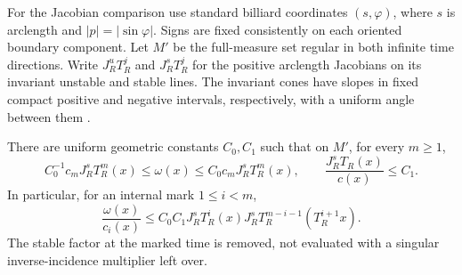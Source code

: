 For the Jacobian comparison use standard billiard coordinates
$(s,\varphi)$, where $s$ is arclength and $|p|=|\sin\varphi|$.
Signs are fixed consistently on each oriented boundary component.
Let $M'$ be the full-measure set regular in both infinite time
directions. Write $J^u_RT_R^j$ and $J^s_RT_R^j$ for the positive
arclength Jacobians on its invariant unstable and stable lines.
The invariant cones have slopes in fixed compact positive and
negative intervals, respectively, with a uniform angle between them
\cite[Section 1.1]{BDPressure}.

\begin{lemma}
\label{lem:v99-stable-weight}
There are uniform geometric constants $C_0,C_1$ such that on $M'$,
for every $m\ge1$,
\begin{equation}\label{eq:v99-stable-weight}
 C_0^{-1}c_m J^s_RT_R^m(x)\le\omega(x)
                         \le C_0c_m J^s_RT_R^m(x),\qquad
 \frac{J^s_RT_R(x)}{c(x)}\le C_1.
\end{equation}
In particular, for an internal mark $1\le i<m$,
\begin{equation}\label{eq:v99-remove-mark}
 \frac{\omega(x)}{c_i(x)}
 \le C_0C_1 J^s_RT_R^i(x)
                    J^s_RT_R^{m-i-1}(T_R^{i+1}x).
\end{equation}
The stable factor at the marked time is removed, not evaluated with
a singular inverse-incidence multiplier left over.
\end{lemma}
